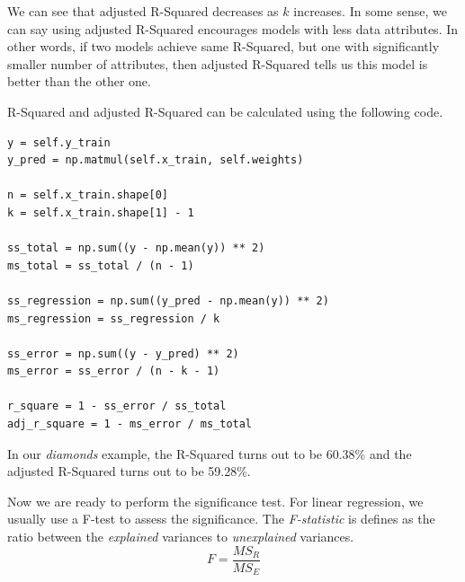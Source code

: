 \documentclass[
	letterpaper
]{article}
\begin{document}
We can see that adjusted R-Squared decreases as $k$ increases.
In some sense, we can say using adjusted R-Squared encourages models with less data attributes.
In other words, if two models achieve same R-Squared, but one with significantly smaller number of attributes, then adjusted R-Squared tells us this model is better than the other one.

R-Squared and adjusted R-Squared can be calculated using the following code.
\begin{lstlisting}
y = self.y_train
y_pred = np.matmul(self.x_train, self.weights)

n = self.x_train.shape[0]
k = self.x_train.shape[1] - 1

ss_total = np.sum((y - np.mean(y)) ** 2)
ms_total = ss_total / (n - 1)

ss_regression = np.sum((y_pred - np.mean(y)) ** 2)
ms_regression = ss_regression / k

ss_error = np.sum((y - y_pred) ** 2)
ms_error = ss_error / (n - k - 1)

r_square = 1 - ss_error / ss_total
adj_r_square = 1 - ms_error / ms_total
\end{lstlisting}

In our \textit{diamonds} example, the R-Squared turns out to be 60.38\% and the adjusted R-Squared turns out to be 59.28\%.

Now we are ready to perform the significance test.
For linear regression, we usually use a F-test to assess the significance.
The \textit{F-statistic} is defines as the ratio between the \textit{explained} variances to \textit{unexplained} variances.
\begin{equation}
F = \frac{MS_R}{MS_E}
\end{equation}
\end{document}
